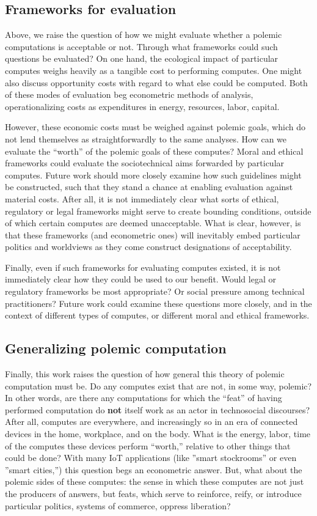 \documentclass[sigconf]{acmart}
\begin{document}
\subsection{Frameworks for evaluation}
\label{sec:org5e2877f}
Above, we raise the question of how we might evaluate whether a polemic computations is acceptable or not.
Through what frameworks could such questions be evaluated? 
On one hand, the ecological impact of particular computes weighs heavily as a tangible cost to performing computes.
One might also discuss opportunity costs with regard to what else could be computed.
Both of these modes of evaluation beg econometric methods of analysis, 
operationalizing costs as expenditures in energy, resources, labor, capital.

However, these economic costs must be weighed against polemic goals, which do not lend themselves as straightforwardly to the same analyses.
How can we evaluate the ``worth'' of the polemic goals of these computes?
Moral and ethical frameworks could evaluate the sociotechnical aims forwarded by particular computes. 
Future work should more closely examine how such guidelines might be constructed, such that they stand a chance at enabling evaluation against material costs.
After all, it is not immediately clear what sorts of ethical, regulatory or legal frameworks 
might serve to create bounding conditions, outside of which certain computes are deemed unacceptable.
What is clear, however, is that these frameworks (and econometric ones) will inevitably
embed particular politics and worldviews as they come construct designations of acceptability.

Finally, even if such frameworks for evaluating computes existed, it is not immediately clear how they could be used to our benefit. 
Would legal or regulatory frameworks be most appropriate?
Or social pressure among technical practitioners?
Future work could examine these questions more closely,
and in the context of different types of computes, or different moral and ethical frameworks.


\subsection{Generalizing polemic computation}
\label{sec:org97fdca4}
Finally, this work raises the question of how general this theory of polemic computation must be.
Do any computes exist that are not, in some way, polemic?
In other words, are there any computations for which the ``feat'' of having performed computation do \textbf{not} itself work as an actor in technosocial discourses?
After all, computes are everywhere, and increasingly so in an era of connected devices in the home, workplace, and on the body. 
What is the energy, labor, time of the computes these devices perform ``worth,'' relative to other things that could be done?
With many IoT applications (like ''smart stockrooms'' or even ''smart cities,'') this question begs an econometric answer.
But, what about the polemic sides of these computes: the sense in which these computes are not just the producers of answers, but feats, which serve to reinforce, reify, or introduce particular politics, systems of commerce, oppress liberation?
\end{document}
